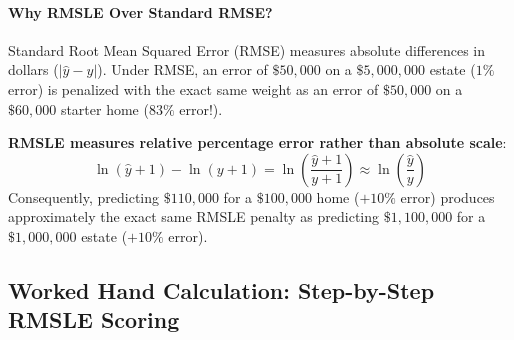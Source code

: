 \paragraph{Why RMSLE Over Standard RMSE?}
Standard Root Mean Squared Error (RMSE) measures absolute differences in dollars ($|\hat{y} - y|$). Under RMSE, an error of $\$50{,}000$ on a $\$5{,}000{,}000$ estate ($1\%$ error) is penalized with the exact same weight as an error of $\$50{,}000$ on a $\$60{,}000$ starter home ($83\%$ error!).

\textbf{RMSLE measures relative percentage error rather than absolute scale}:
\begin{equation}
\ln(\hat{y} + 1) - \ln(y + 1) = \ln\left( \frac{\hat{y} + 1}{y + 1} \right) \approx \ln\left( \frac{\hat{y}}{y} \right)
\end{equation}
Consequently, predicting $\$110{,}000$ for a $\$100{,}000$ home ($+10\%$ error) produces approximately the exact same RMSLE penalty as predicting $\$1{,}100{,}000$ for a $\$1{,}000{,}000$ estate ($+10\%$ error).

\subsection{Worked Hand Calculation: Step-by-Step RMSLE Scoring}\label{subsec:rmsle_calculation}

